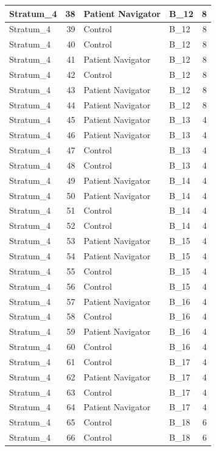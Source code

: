 \documentclass[
]{book}
\begin{document}
\begin{table}[H]
\begin{tabular}{l|r|l|l|r}
\hline
Stratum\_4 & 38 & Patient Navigator & B\_12 & 8\\
\hline
Stratum\_4 & 39 & Control & B\_12 & 8\\
\hline
Stratum\_4 & 40 & Control & B\_12 & 8\\
\hline
Stratum\_4 & 41 & Patient Navigator & B\_12 & 8\\
\hline
Stratum\_4 & 42 & Control & B\_12 & 8\\
\hline
Stratum\_4 & 43 & Patient Navigator & B\_12 & 8\\
\hline
Stratum\_4 & 44 & Patient Navigator & B\_12 & 8\\
\hline
Stratum\_4 & 45 & Patient Navigator & B\_13 & 4\\
\hline
Stratum\_4 & 46 & Patient Navigator & B\_13 & 4\\
\hline
Stratum\_4 & 47 & Control & B\_13 & 4\\
\hline
Stratum\_4 & 48 & Control & B\_13 & 4\\
\hline
Stratum\_4 & 49 & Patient Navigator & B\_14 & 4\\
\hline
Stratum\_4 & 50 & Patient Navigator & B\_14 & 4\\
\hline
Stratum\_4 & 51 & Control & B\_14 & 4\\
\hline
Stratum\_4 & 52 & Control & B\_14 & 4\\
\hline
Stratum\_4 & 53 & Patient Navigator & B\_15 & 4\\
\hline
Stratum\_4 & 54 & Patient Navigator & B\_15 & 4\\
\hline
Stratum\_4 & 55 & Control & B\_15 & 4\\
\hline
Stratum\_4 & 56 & Control & B\_15 & 4\\
\hline
Stratum\_4 & 57 & Patient Navigator & B\_16 & 4\\
\hline
Stratum\_4 & 58 & Control & B\_16 & 4\\
\hline
Stratum\_4 & 59 & Patient Navigator & B\_16 & 4\\
\hline
Stratum\_4 & 60 & Control & B\_16 & 4\\
\hline
Stratum\_4 & 61 & Control & B\_17 & 4\\
\hline
Stratum\_4 & 62 & Patient Navigator & B\_17 & 4\\
\hline
Stratum\_4 & 63 & Control & B\_17 & 4\\
\hline
Stratum\_4 & 64 & Patient Navigator & B\_17 & 4\\
\hline
Stratum\_4 & 65 & Control & B\_18 & 6\\
\hline
Stratum\_4 & 66 & Control & B\_18 & 6\\

\end{tabular}
\end{table}
\end{document}
